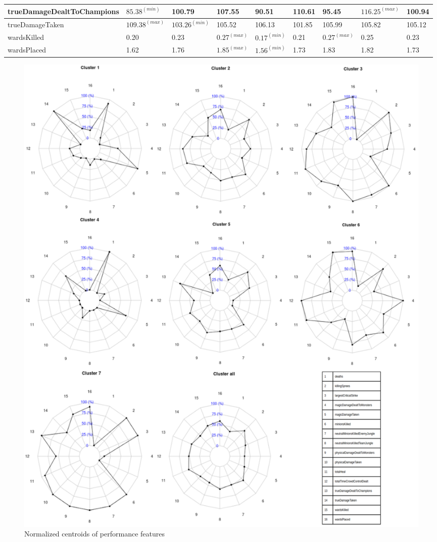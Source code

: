 \begin{table}
\begin{tabular}{lp{}p{}p{}p{}p{}p{}p{}p{}}
trueDamageDealtToChampions&        $85.38^{(min)}$&  100.79&  107.55&   90.51&  110.61&   95.45&   $116.25^{(max)}$&  100.94\\ \hline
trueDamageTaken&                  $109.38^{(max)}$&  $103.26^{(min)}$&  105.52&  106.13&  101.85&  105.99&   105.82&  105.12\\ \hline
wardsKilled&                        0.20&    0.23&    $0.27^{(max)}$&    $0.17^{(min)}$&    0.21&    $0.27^{(max)}$&     0.25&    0.23\\ \hline
wardsPlaced&                        1.62&    1.76&    $1.85^{(max)}$&    $1.56^{(min)}$&    1.73&    1.83&     1.82&    1.73\\
  \bottomrule
\end{tabular}
\end{table}

\begin{figure}
\includegraphics[width=1\textwidth,height=\textheight,keepaspectratio]{radars}
\caption{Normalized centroids of performance features}
\label{fig:radars}
\end{figure}

